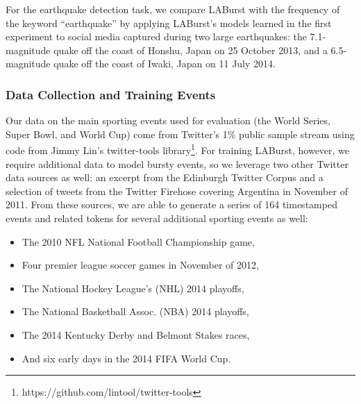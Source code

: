 \documentclass{sig-alternate}
\newcommand{\red}[1]{\textcolor{red}{#1}}
\begin{document}
For the earthquake detection task, we compare LABurst with the frequency of the keyword ``earthquake'' by applying LABurst's models learned in the first experiment to social media captured during two large earthquakes: the 7.1-magnitude quake off the coast of Honshu, Japan on 25 October 2013, and a 6.5-magnitude quake off the coast of Iwaki, Japan on 11 July 2014.

\subsubsection{Data Collection and Training Events}

Our data on the main sporting events used for evaluation (the World Series, Super Bowl, and World Cup) come from Twitter's 1\% public sample stream using code from Jimmy Lin's twitter-tools library\footnote{https://github.com/lintool/twitter-tools}.
For training LABurst, however, we require additional data to model bursty events, so we leverage two other Twitter data sources as well: an excerpt from the Edinburgh Twitter Corpus \cite{Petrovic:2010:ETC:1860667.1860680} and a selection of tweets from the Twitter Firehose covering Argentina in November of 2011.
From these sources, we are able to generate a series of 164 timestamped events and related tokens for several additional sporting events as well: %
%


\begin{itemize} 
\item The 2010 NFL National Football Championship game, 
\item Four premier league soccer games in November of 2012, %
\item The National Hockey League's (NHL) 2014 playoffs, 
\item The National Basketball Assoc. (NBA) 2014 playoffs, 
\item The 2014 Kentucky Derby and Belmont Stakes races, 
\item And six early days in the 2014 FIFA World Cup.
\end{itemize}
\end{document}
